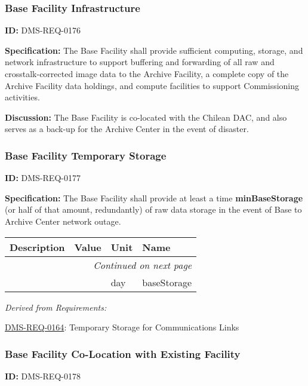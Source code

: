 \documentclass[SE,toc,lsstdraft]{lsstdoc}
\makeatletter
\newcommand{\paramname}[1]{\hspace{0pt}#1}
\newcommand{\unitname}[1]{\hspace{0pt}#1}
\newenvironment{parameters}[0]{%
\setlength\LTleft{0pt}
\setlength\LTright{\fill}
\begin{small}
\begin{longtable}[]{|p{0.5\textwidth}|l|p{0.6in}|p{1.74in}@{}|}

\hline \textbf{Description} & \textbf{Value} & \textbf{Unit} & \textbf{Name} \\ \hline
\endhead

\hline \multicolumn{4}{r}{\emph{Continued on next page}} \\
\endfoot

\hline\hline
\endlastfoot
}{%
\hline
\end{longtable}
\end{small}
}
\makeatother
\begin{document}
\subsubsection{Base Facility Infrastructure}

\label{DMS-REQ-0176}
\textbf{ID:} DMS-REQ-0176

\textbf{Specification:} The Base Facility shall provide sufficient computing, storage, and network infrastructure to support buffering and forwarding of all raw and crosstalk-corrected image data to the Archive Facility, a complete copy of the Archive Facility data holdings, and compute facilities to support Commissioning activities.

\textbf{Discussion:} The Base Facility is co-located with the Chilean DAC, and also serves as a back-up for the Archive Center in the event of disaster.




\subsubsection{Base Facility Temporary Storage}

\label{DMS-REQ-0177}
\textbf{ID:} DMS-REQ-0177

\textbf{Specification:} The Base Facility shall provide at least a time \textbf{minBaseStorage }(or half of that amount, redundantly) of raw data storage in the event of Base to Archive Center network outage.





\begin{parameters}

&

&
\unitname{%
day
}
&
\paramname{%
baseStorage
} \\\hline
\end{parameters}




\emph{Derived from Requirements:}

\hyperref[DMS-REQ-0164]{DMS-REQ-0164}:
Temporary Storage for Communications Links \newline


\subsubsection{Base Facility Co-Location with Existing Facility}

\label{DMS-REQ-0178}
\textbf{ID:} DMS-REQ-0178
\end{document}
